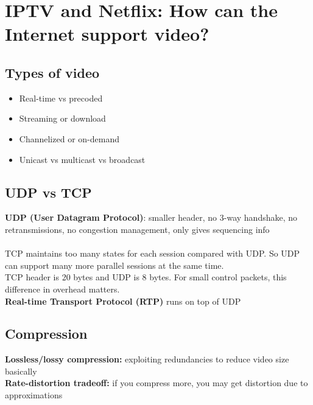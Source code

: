 \documentclass{article}
\begin{document}
\section{IPTV and Netflix: How can the Internet support video?}

\subsection{Types of video}

\begin{itemize}
\item Real-time vs precoded
\item Streaming or download
\item Channelized or on-demand
\item Unicast vs multicast vs broadcast
\end{itemize}

\subsection{UDP vs TCP}

\textbf{UDP (User Datagram Protocol)}: smaller header, no 3-way handshake, no retransmissions, no congestion management, only gives sequencing info \\
\\
TCP maintains too many states for each session compared with UDP. So UDP can support many more parallel sessions at the same time. \\
TCP header is 20 bytes and UDP is 8 bytes. For small control packets, this difference in overhead matters. \\
\textbf{Real-time Transport Protocol (RTP)} runs on top of UDP

\subsection{Compression}

\textbf{Lossless/lossy compression:} exploiting redundancies to reduce video size basically \\
\textbf{Rate-distortion tradeoff:} if you compress more, you may get distortion due to approximations
\end{document}
